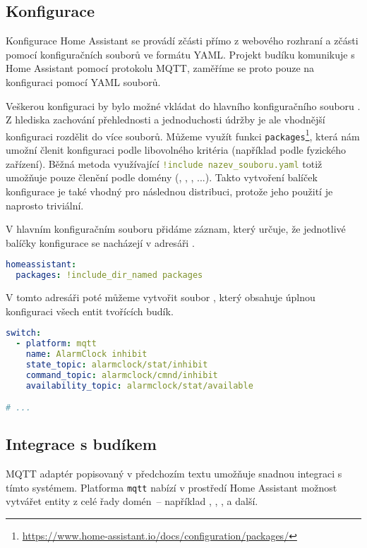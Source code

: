 \subsection{Konfigurace}
Konfigurace Home Assistant se provádí zčásti přímo z webového rozhraní a zčásti
pomocí konfiguračních souborů ve formátu YAML. Projekt budíku komunikuje s Home
Assistant pomocí protokolu MQTT, zaměříme se proto pouze na konfiguraci pomocí
YAML souborů.

Veškerou konfiguraci by bylo možné vkládat do hlavního konfiguračního souboru
.
Z hlediska zachování přehlednosti a jednoduchosti údržby je ale vhodnější
konfiguraci rozdělit do více souborů.
Můžeme využít funkci
\texttt{packages}\footnote{\url{https://www.home-assistant.io/docs/configuration/packages/}},
která nám umožní členit konfiguraci podle libovolného kritéria (například podle
fyzického zařízení). Běžná metoda využívající
\lstinline[language=yaml]|!include nazev_souboru.yaml| totiž umožňuje pouze
členění podle domény (, ,
, ...). Takto vytvoření balíček konfigurace je také vhodný pro
následnou distribuci, protože jeho použití je naprosto triviální.

V hlavním konfiguračním souboru  přidáme záznam,
který určuje, že jednotlivé balíčky konfigurace se nacházejí v adresáři
.
\begin{lstlisting}[language=yaml]
homeassistant:
  packages: !include_dir_named packages
\end{lstlisting}
V tomto adresáři poté můžeme vytvořit soubor
, který obsahuje úplnou konfiguraci všech
entit tvořících budík.
\begin{lstlisting}[language=yaml]
switch:
  - platform: mqtt
    name: AlarmClock inhibit
    state_topic: alarmclock/stat/inhibit
    command_topic: alarmclock/cmnd/inhibit
    availability_topic: alarmclock/stat/available

# ...
\end{lstlisting}



\subsection{Integrace s budíkem}
MQTT adaptér  popisovaný v předchozím textu
umožňuje snadnou integraci s tímto systémem. Platforma \texttt{mqtt} nabízí
v prostředí Home Assistant možnost vytvářet entity z celé řady domén~--
například , , ,
 a další.

